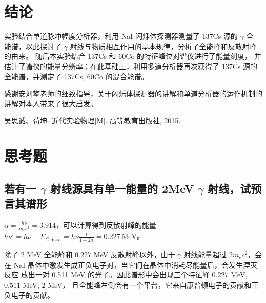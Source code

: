 \documentclass[revtex4-2]{mpltx}
\begin{document}
\section{结论}
    实验结合单道脉冲幅度分析器，利用 NaI 闪烁体探测器测量了 137Cs 源的 $\gamma$ 全
    能谱，以此探讨了 $\gamma$ 射线与物质相互作用的基本规律，分析了全能峰和反散射峰的由来。
    随后本实验结合 137Cs 和 60Co 的特征峰位对谱仪进行了能量刻度，
    并估计了谱仪的能量分辨率；在此基础上，利用多道分析器再次获得了 137Cs 源的全能谱，并测定了
    137Cs, 60Co 的混合能谱。
\begin{acknowledgments}
    感谢安刘攀老师的细致指导，关于闪烁体探测器的讲解和单道分析器的运作机制的讲解对本人带来了很大启发。
\end{acknowledgments}
\begin{thebibliography}{99}
     吴思诚、荀坤. 近代实验物理[M]. 高等教育出版社, 2015.
\end{thebibliography}
\clearpage
\appendix
\section{思考题}
\subsection{若有一 $\gamma$ 射线源具有单一能量的 2MeV $\gamma$ 射线，试预言其谱形}
$\alpha = \frac{h\nu}{m_e c^2} = 3.914$，可以计算得到反散射峰的能量
$h\nu' = h\nu -E_{C \max} = h\nu \frac{1}{1+2\alpha} = 0.227\ \mathrm{MeV}$。

除了 $2$ MeV 全能峰和 $0.227$ MeV 反散射峰以外，由于 $\gamma$ 射线能量超过
$2m_e c^2$，会在 NaI 晶体中激发生成正负电子对，当它们在晶体中消耗尽能量后，会发生湮灭反应
放出一对 0.511 MeV 的光子。因此谱形中会出现三个特征峰 $0.227$ MeV, $0.511$ MeV, $2$ MeV，
且全能峰左侧会有一个平台，它来自康普顿电子的贡献和正负电子的贡献。
\end{document}
